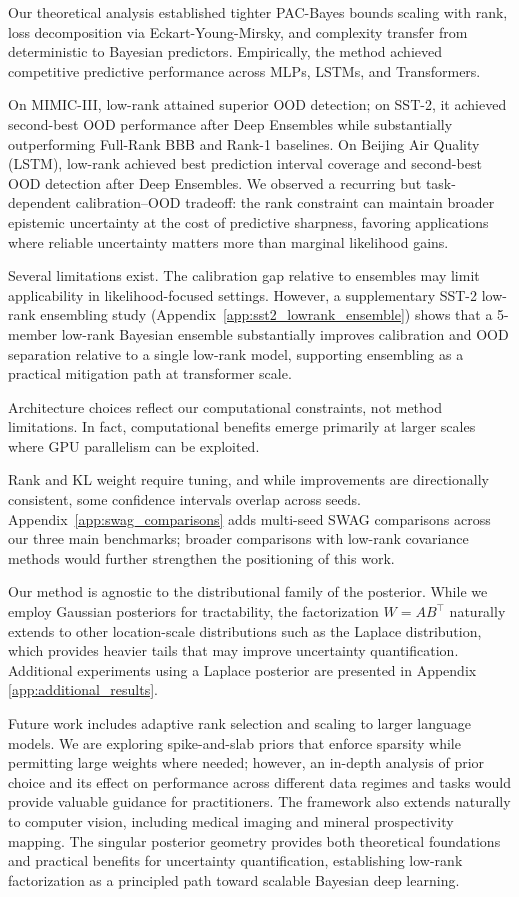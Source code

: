 \documentclass{article}
\theoremstyle{plain}
\theoremstyle{definition}
\theoremstyle{remark}
\begin{document}
Our theoretical analysis established tighter PAC-Bayes bounds scaling with rank, loss decomposition via Eckart-Young-Mirsky, and complexity transfer from deterministic to Bayesian predictors. Empirically, the method achieved competitive predictive performance across MLPs, LSTMs, and Transformers. 

On MIMIC-III, low-rank attained superior OOD detection; on SST-2, it achieved second-best OOD performance after Deep Ensembles while substantially outperforming Full-Rank BBB and Rank-1 baselines. On Beijing Air Quality (LSTM), low-rank achieved best prediction interval coverage and second-best OOD detection after Deep Ensembles. We observed a recurring but task-dependent calibration--OOD tradeoff: the rank constraint can maintain broader epistemic uncertainty at the cost of predictive sharpness, favoring applications where reliable uncertainty matters more than marginal likelihood gains.

Several limitations exist. The calibration gap relative to ensembles may limit applicability in
likelihood-focused settings. However, a supplementary SST-2 low-rank ensembling
study (Appendix~\ref{app:sst2_lowrank_ensemble}) shows that a 5-member low-rank
Bayesian ensemble substantially improves calibration and OOD separation relative
to a single low-rank model, supporting ensembling as a practical mitigation path
at transformer scale.

Architecture choices reflect our computational constraints, not method limitations. In fact, computational benefits emerge primarily at larger scales where GPU parallelism can be exploited.

Rank and KL weight require tuning, and while improvements are directionally consistent, some confidence intervals overlap across seeds. Appendix~\ref{app:swag_comparisons} adds multi-seed SWAG comparisons across our three main benchmarks; broader comparisons with low-rank covariance methods would further strengthen the positioning of this work.

Our method is agnostic to the distributional family of the posterior. While we employ Gaussian posteriors for tractability, the factorization $W = AB^\top$ naturally extends to other location-scale distributions such as the Laplace distribution, which provides heavier tails that may improve uncertainty quantification. Additional experiments using a Laplace posterior are presented in Appendix \ref{app:additional_results}.

Future work includes adaptive rank selection and scaling to larger language models. We are exploring spike-and-slab priors that enforce sparsity while permitting large weights where needed; however, an in-depth analysis of prior choice and its effect on performance across different data regimes and tasks would provide valuable guidance for practitioners. The framework also extends naturally to computer vision, including medical imaging and mineral prospectivity mapping. The singular posterior geometry provides both theoretical foundations and practical benefits for uncertainty quantification, establishing low-rank factorization as a principled path toward scalable Bayesian deep learning.
\end{document}
